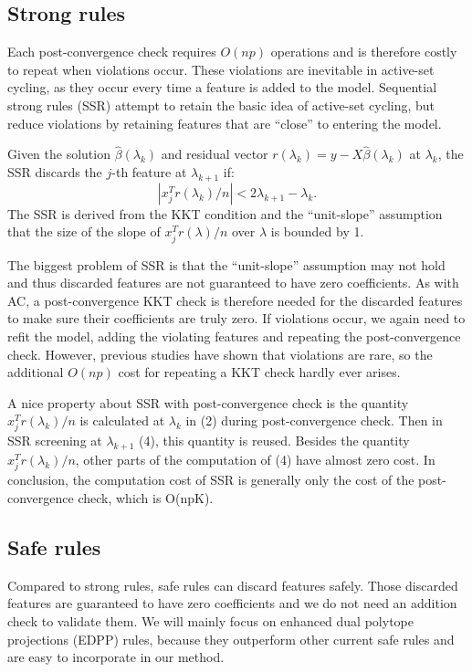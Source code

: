 \subsection{Strong rules}

Each post-convergence check requires $O(np)$ operations and is therefore costly to repeat when violations occur.  These violations are inevitable in active-set cycling, as they occur every time a feature is added to the model.  Sequential strong rules (SSR) \citep{tibshirani2011regression} attempt to retain the basic idea of active-set cycling, but reduce violations by retaining features that are ``close'' to entering the model.

Given the solution $\hat{\beta}(\lambda_k)$ and residual vector $r(\lambda_k)=y-X\hat{\beta}(\lambda_k)$ at $\lambda_k$, the SSR discards the $j$-th feature at $\lambda_{k+1}$ if:
\begin{equation}
    |x_j^Tr(\lambda_k)/n|<2\lambda_{k+1}-\lambda_k.
\end{equation}
The SSR is derived from the KKT condition and the ``unit-slope'' assumption that the size of the slope of $x_j^Tr(\lambda)/n$ over $\lambda$ is bounded by 1. 

The biggest problem of SSR is that the ``unit-slope'' assumption may not hold and thus discarded features are not guaranteed to have zero coefficients. As with AC, a post-convergence KKT check is therefore needed for the discarded features to make sure their coefficients are truly zero. If violations occur, we again need to refit the model, adding the violating features and repeating the post-convergence check. However, previous studies have shown that violations are rare, so the additional $O(np)$ cost for repeating a KKT check hardly ever arises.

A nice property about SSR with post-convergence check is the quantity $x_j^Tr(\lambda_k)/n$ is calculated at $\lambda_k$ in (2) during post-convergence check. Then in SSR screening at $\lambda_{k+1}$ (4), this quantity is reused. Besides the quantity $x_j^Tr(\lambda_k)/n$, other parts of the computation of (4) have almost zero cost. In conclusion, the computation cost of SSR is generally only the cost of the post-convergence check, which is O(npK).

\subsection{Safe rules}

Compared to strong rules, safe rules can discard features safely. Those discarded features are guaranteed to have zero coefficients and we do not need an addition check to validate them. We will mainly focus on enhanced dual polytope projections (EDPP) rules\citep{wang2013lasso}, because they outperform other current safe rules and are easy to incorporate in our method.

